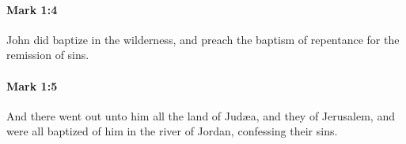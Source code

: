 		\paragraph{Mark 1:4} %
			\label{MARK-1-4}

			John did baptize in the wilderness, and preach the baptism of repentance for the remission of sins.

			\begin{framed}
			\scriptsize
				\begin{compactdesc}
					\item[SBLG]  \hyperref[APHESIS]{} 
				\end{compactdesc}
			\end{framed}

		\paragraph{Mark 1:5} %
			\label{MARK-1-5}

			And there went out unto him all the land of Judæa, and they of Jerusalem, and were all baptized of him in the river of Jordan, confessing their sins.

